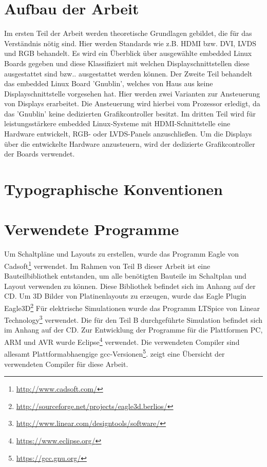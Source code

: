 \section{Aufbau der Arbeit}
Im ersten Teil der Arbeit werden theoretische Grundlagen gebildet, die für das Verständnis nötig sind. Hier werden Standards wie z.B. HDMI bzw. DVI, LVDS und RGB behandelt. Es wird ein Überblick über ausgewählte embedded Linux Boards gegeben und diese Klassifiziert mit welchen Displayschnittstellen diese ausgestattet sind bzw.. ausgestattet werden können.
Der Zweite Teil behandelt das embedded Linux Board 'Gnublin', welches von Haus aus keine Displayschnittstelle vorgesehen hat. Hier werden zwei Varianten zur Ansteuerung von Displays erarbeitet. Die Ansteuerung wird hierbei vom Prozessor erledigt, da das 'Gnublin' keine dedizierten Grafikcontroller besitzt.
Im dritten Teil wird für leistungsstärkere embedded Linux-Systeme mit HDMI-Schnittstelle eine Hardware entwickelt, RGB- oder LVDS-Panels anzuschließen. Um die Displays über die entwickelte Hardware anzusteuern, wird der dedizierte Grafikcontroller der Boards verwendet.

\section{Typographische Konventionen}

\section{Verwendete Programme}
Um Schaltpläne und Layouts zu erstellen, wurde das Programm Eagle von Cadsoft\footnote{\url{http://www.cadsoft.com/}} verwendet. Im Rahmen von Teil B dieser Arbeit ist eine Bauteilbibliothek entstanden, um alle benötigten Bauteile im Schaltplan und Layout verwenden zu können. Diese Bibliothek befindet sich im Anhang auf der CD.
Um 3D Bilder von Platinenlayouts zu erzeugen, wurde das Eagle Plugin Eagle3D\footnote{\url{http://sourceforge.net/projects/eagle3d.berlios/}} 
Für elektrische Simulationen wurde das Programm LTSpice von Linear Technology\footnote{\url{http://www.linear.com/designtools/software/}} verwendet. Die für den Teil B durchgeführte Simulation befindet sich im Anhang auf der CD.
Zur Entwicklung der Programme für die Plattformen PC, ARM und AVR wurde Eclipse\footnote{\url{https://www.eclipse.org/}} verwendet. Die verwendeten Compiler sind allesamt Plattformabhaengige gcc-Versionen\footnote{\url{https://gcc.gnu.org/}}.  zeigt eine Übersicht der verwendeten Compiler für diese Arbeit.


